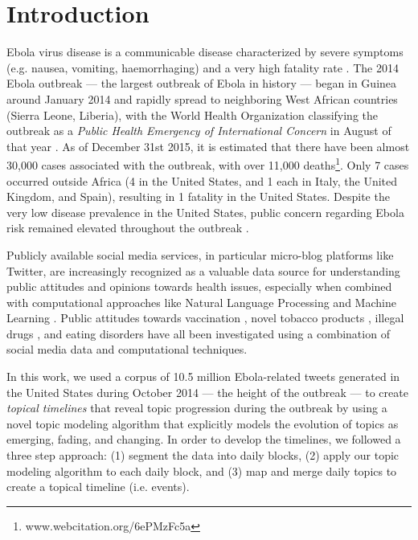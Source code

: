 \section{Introduction}
Ebola virus disease is a communicable disease characterized by severe
symptoms (e.g. nausea, vomiting, haemorrhaging) and a very high
fatality rate \cite{WHO-Ebola-Response-Team:2014aa}.   The 2014 Ebola
outbreak --- the largest outbreak of Ebola in history --- began in
Guinea around January 2014 and rapidly spread to neighboring West
African countries (Sierra Leone, Liberia), with the World Health
Organization classifying the outbreak as a \emph{Public Health
  Emergency of International Concern} in August of that
year \cite{Weyer:2015aa}.  As of December 31st 2015, it is estimated
that there have been almost 30,000 cases associated with the outbreak,
with over 11,000 deaths\footnote{www.webcitation.org/6ePMzFc5a}.  Only 7 cases occurred outside Africa (4 in
the United States, and 1 each in Italy, the United Kingdom, and
Spain), resulting in 1 fatality in the United States.  Despite the
very low disease prevalence in the United States, public concern
regarding Ebola risk remained elevated throughout the
outbreak \cite{Towers:2015aa}.

Publicly available social media services, in particular micro-blog platforms like Twitter, are
increasingly recognized as a valuable data source for understanding
public attitudes and
opinions towards health issues, especially when combined with
computational approaches like Natural
Language Processing and Machine Learning \cite{Dredze:2012qy}.     Public attitudes towards vaccination
\cite{Salathe:2011aa}, novel tobacco products \cite{Myslin:2013aa},
illegal drugs \cite{Krauss:2015aa}, and eating disorders \cite{DBLP:conf/ehealth/Choudhury15} have all been investigated
using a combination of social media data and computational techniques.   


In this work, 
we used a corpus of 10.5 million Ebola-related tweets
generated in the United States during October 2014 --- the height of
the outbreak ---
to create \emph{topical timelines} that reveal 
topic progression during the outbreak by using a novel topic modeling
algorithm that explicitly models the evolution of topics
as emerging, fading, and changing.
In order to develop the
timelines, we followed a three step approach: (1) segment the data into
daily blocks, (2) apply our topic modeling algorithm to each daily
block, and (3) map and merge daily topics to create a topical
timeline (i.e. events).

